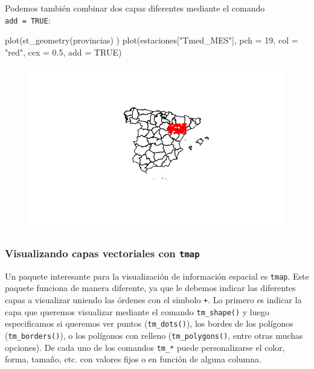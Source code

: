 \documentclass[
  letterpaper,
  DIV=11,
  numbers=noendperiod]{scrreprt}
\newenvironment{Shaded}{\begin{snugshade}}{\end{snugshade}}
\newcommand{\AttributeTok}[1]{\textcolor[rgb]{0.40,0.45,0.13}{#1}}
\newcommand{\ConstantTok}[1]{\textcolor[rgb]{0.56,0.35,0.01}{#1}}
\newcommand{\DecValTok}[1]{\textcolor[rgb]{0.68,0.00,0.00}{#1}}
\newcommand{\FloatTok}[1]{\textcolor[rgb]{0.68,0.00,0.00}{#1}}
\newcommand{\FunctionTok}[1]{\textcolor[rgb]{0.28,0.35,0.67}{#1}}
\newcommand{\NormalTok}[1]{\textcolor[rgb]{0.00,0.23,0.31}{#1}}
\newcommand{\StringTok}[1]{\textcolor[rgb]{0.13,0.47,0.30}{#1}}
\begin{document}
Podemos también combinar dos capas diferentes mediante el comando
\texttt{add\ =\ TRUE}:

\begin{Shaded}
\begin{Highlighting}[]
\FunctionTok{plot}\NormalTok{(}\FunctionTok{st\_geometry}\NormalTok{(provincias) )}
\FunctionTok{plot}\NormalTok{(estaciones[}\StringTok{"Tmed\_MES"}\NormalTok{], }\AttributeTok{pch =} \DecValTok{19}\NormalTok{, }\AttributeTok{col =} \StringTok{"red"}\NormalTok{, }\AttributeTok{cex =} \FloatTok{0.5}\NormalTok{, }\AttributeTok{add =} \ConstantTok{TRUE}\NormalTok{) }
\end{Highlighting}
\end{Shaded}

\begin{figure}[H]

{\centering \includegraphics{03_DatosEspaciales_files/figure-pdf/unnamed-chunk-12-1.pdf}

}

\end{figure}

\hypertarget{visualizando-capas-vectoriales-con-tmap}{%
\subsubsection{\texorpdfstring{Visualizando capas vectoriales con
\texttt{tmap}}{Visualizando capas vectoriales con tmap}}\label{visualizando-capas-vectoriales-con-tmap}}

Un paquete interesante para la visualización de información espacial es
\texttt{tmap}. Este paquete funciona de manera diferente, ya que le
debemos indicar las diferentes capas a visualizar uniendo las órdenes
con el símbolo \texttt{+}. Lo primero es indicar la capa que queremos
visualizar mediante el comando \texttt{tm\_shape()} y luego
especificamos si queremos ver puntos (\texttt{tm\_dots()}), los bordes
de los polígonos (\texttt{tm\_borders()}), o los polígonos con relleno
(\texttt{tm\_polygons()}, entre otras muchas opciones). De cada uno de
los comandos \texttt{tm\_*} puede personalizarse el color, forma,
tamaño, etc. con valores fijos o en función de alguna columna.
\end{document}
